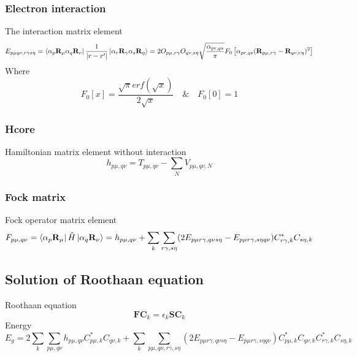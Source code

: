 \documentclass{article}
\begin{document}
        \subsubsection{Electron interaction}
            The interaction matrix element
            \begin{equation}
                E_{p\mu q\nu,r\gamma s\eta} = \bra{\alpha_p\textbf{R}_{\mu}\alpha_q\textbf{R}_{\nu}}
                \frac{1}{|r-r'|}\ket{\alpha_r\textbf{R}_{\gamma}\alpha_s\textbf{R}_{\eta}} 
                = 2 O_{p\mu,r\gamma}O_{q\nu,s\eta}\sqrt{\frac{\alpha_{pr,qs}}{\pi}}
                F_0\left[\alpha_{pr,qs}(\textbf{R}_{p\mu,r\gamma}-\textbf{R}_{q\nu,r\eta})^2\right]
            \end{equation}
            Where
            \begin{equation}
                F_0\left[x\right] = \frac{\sqrt{\pi}erf(\sqrt{x})}{2\sqrt{x}} \quad \& \quad F_0\left[0\right] = 1
            \end{equation}
            
        \subsubsection{Hcore}
            Hamiltonian matrix element without interaction
            \begin{equation}
                h_{p\mu,q\nu} = T_{p\mu,q\nu} - \sum_{N}V_{p\mu,q\nu,N}
            \end{equation}
        \subsubsection{Fock matrix}
            Fock operator matrix element
            \begin{equation}
                F_{p\mu,q\nu} = \bra{\alpha_p\textbf{R}_{\mu}}\hat{H}\ket{\alpha_q\textbf{R}_{\nu}} 
                = h_{p\mu,q\nu} + \sum_{k}\sum_{r\gamma,s\eta} 
                (2E_{p\mu r\gamma,q\nu s\eta}-E_{p\mu r\gamma,s\eta q\nu})C_{r\gamma,k}^*C_{s\eta,k}
            \end{equation}

    \subsection{Solution of Roothaan equation}
        Roothaan equation
        \begin{equation}
            \textbf{FC}_k = \epsilon_k\textbf{SC}_k
        \end{equation}
        Energy
        \begin{equation}
            E_g = 2\sum_k\sum_{p\mu,q\nu}h_{p\mu,q\nu}C_{p\mu,k}^*C_{q\nu,k}+
            \sum_k\sum_{p\mu,q\nu,r\gamma,s\eta}(2E_{p\mu r\gamma,q\nu s\eta}-
            E_{p\mu r\gamma,s\eta q\nu})C_{p\mu,k}^*C_{q\nu,k}C_{r\gamma,k}^*C_{s\eta,k}
        \end{equation}
        
\end{document}
